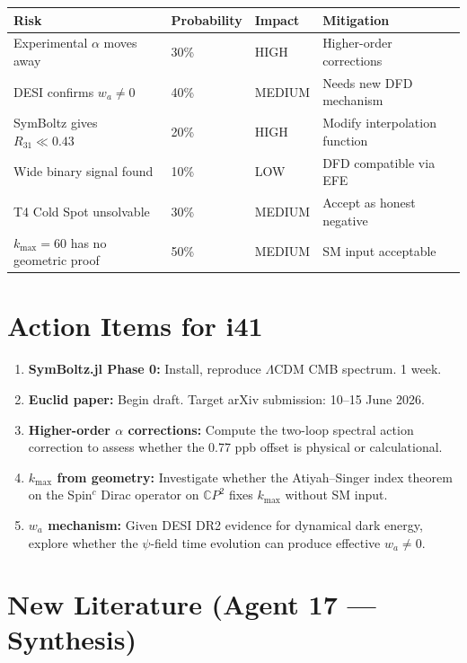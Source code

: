 \documentclass[11pt,a4paper]{article}
\newcommand{\CP}{\mathbb{C}P}
\begin{document}
\begin{center}
\begin{tabular}{llll}
\toprule
\textbf{Risk} & \textbf{Probability} & \textbf{Impact} & \textbf{Mitigation} \\
\midrule
Experimental $\alpha$ moves away & 30\% & HIGH & Higher-order corrections \\
DESI confirms $w_a \neq 0$ & 40\% & MEDIUM & Needs new DFD mechanism \\
SymBoltz gives $R_{31} \ll 0.43$ & 20\% & HIGH & Modify interpolation function \\
Wide binary signal found & 10\% & LOW & DFD compatible via EFE \\
T4 Cold Spot unsolvable & 30\% & MEDIUM & Accept as honest negative \\
$k_{\max} = 60$ has no geometric proof & 50\% & MEDIUM & SM input acceptable \\
\bottomrule
\end{tabular}
\end{center}

\section{Action Items for i41}

\begin{enumerate}
\item \textbf{SymBoltz.jl Phase 0:} Install, reproduce $\Lambda$CDM CMB spectrum. 1 week.
\item \textbf{Euclid paper:} Begin draft. Target arXiv submission: 10--15 June 2026.
\item \textbf{Higher-order $\alpha$ corrections:} Compute the two-loop spectral action correction to assess whether the 0.77 ppb offset is physical or calculational.
\item \textbf{$k_{\max}$ from geometry:} Investigate whether the Atiyah--Singer index theorem on the Spin$^c$ Dirac operator on $\CP^2$ fixes $k_{\max}$ without SM input.
\item \textbf{$w_a$ mechanism:} Given DESI DR2 evidence for dynamical dark energy, explore whether the $\psi$-field time evolution can produce effective $w_a \neq 0$.
\end{enumerate}

\section{New Literature (Agent 17 --- Synthesis)}
\end{document}
